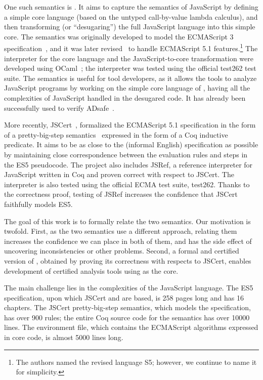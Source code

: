 \documentclass{llncs}
\begin{document}
One such semantics is \lambdajs. It aims to capture
the semantics of JavaScript by defining a simple core language
(based on the untyped call-by-value lambda calculus), and then
transforming (or ``desugaring'') the full JavaScript language into this
simple core. The \lambdajs semantics was originally developed to model the 
ECMAScript 3 specification~\cite{Guha-al:ECOOP10}, and it was later
revised~\cite{Politz-al:DLS12} to handle ECMAScript 5.1
features.\footnote{The authors named the revised language S5; however,
we continue to name it \lambdajs for simplicity.}
The interpreter for the core language and the JavaScript-to-core
transformation were developed using 
OCaml~\cite{github:brownplt/LambdaS5};
the interpreter was tested using the official test262 test suite.
The \lambdajs semantics is useful for tool developers, as it
allows the tools to analyze JavaScript programs by working
on the simple core language of \lambdajs, having all the complexities
of JavaScript handled in the desugared code. It has already been
successfully used to verify ADsafe~\cite{Politz-al:SEC11}.

More recently, JSCert~\cite{Bodin-al:POPL14}, formalized the ECMAScript 5.1
specification in the form of a pretty-big-step
semantics~\cite{Chargueraud:ESOP13} expressed in the form of a Coq inductive
predicate. It aims to be as close to the (informal English) specification as
possible by maintaining close correspondence between the evaluation rules and
steps in the ES5 pseudocode. The project also includes JSRef, a reference
interpreter for JavaScript written in Coq and proven correct with respect to
JSCert. The interpreter is also tested using the official ECMA test suite,
test262. Thanks to the correctness proof, testing of JSRef increases the
confidence that JSCert faithfully models ES5.

The goal of this work is to formally relate the two semantics. Our motivation
is twofold. First, as the two semantics use a different approach, relating them
increases the confidence we can place in both of them, and has the side effect
of uncovering inconsistencies or other problems. Second, a formal and certified
version of \lambdajs, obtained by proving its correctness with respects to
JSCert, enables development of certified analysis tools using \lambdajs as the
core.

The main challenge lies in the complexities of the JavaScript language. The ES5
specification, upon which JSCert and \lambdajs are based, is 258 pages long and
has 16 chapters. The JSCert pretty-big-step semantics, which models the
specification, has over 900 rules; the entire Coq source code for the semantics
has over 10000 lines. The \lambdajs environment file, which contains the
ECMAScript algorithms expressed in core \lambdajs code, is almost 5000 lines
long.
\end{document}

